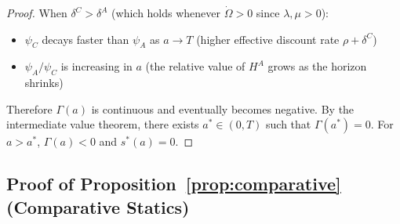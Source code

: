 \documentclass[11pt,a4paper]{article}
\theoremstyle{definition}
\begin{document}
\begin{proof}
When $\delta^C > \delta^A$ (which holds whenever $\dot{\Omega} > 0$ since $\lambda, \mu > 0$):
\begin{itemize}
\item $\psi_C$ decays faster than $\psi_A$ as $a \to T$ (higher effective discount rate $\rho + \delta^C$)
\item $\psi_A / \psi_C$ is increasing in $a$ (the relative value of $H^A$ grows as the horizon shrinks)
\end{itemize}

Therefore $\Gamma(a)$ is continuous and eventually becomes negative. By the intermediate value theorem, there exists $a^* \in (0, T)$ such that $\Gamma(a^*) = 0$. For $a > a^*$, $\Gamma(a) < 0$ and $s^*(a) = 0$.
\end{proof}

\subsection{Proof of Proposition~\ref{prop:comparative} (Comparative Statics)}
\end{document}
